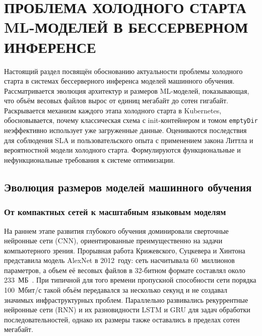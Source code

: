 \section{ПРОБЛЕМА ХОЛОДНОГО СТАРТА ML-МОДЕЛЕЙ В БЕССЕРВЕРНОМ ИНФЕРЕНСЕ}

Настоящий раздел посвящён обоснованию актуальности проблемы холодного старта в системах бессерверного инференса моделей машинного обучения. Рассматривается эволюция архитектур и размеров ML-моделей, показывающая, что объём весовых файлов вырос от единиц мегабайт до сотен гигабайт. Раскрывается механизм каждого этапа холодного старта в Kubernetes, обосновывается, почему классическая схема с init-контейнером и томом \texttt{emptyDir} неэффективно использует уже загруженные данные. Оцениваются последствия для соблюдения SLA и пользовательского опыта с применением закона Литтла и вероятностной модели холодного старта. Формулируются функциональные и нефункциональные требования к системе оптимизации.

\subsection{Эволюция размеров моделей машинного обучения}

\subsubsection{От компактных сетей к масштабным языковым моделям}

На раннем этапе развития глубокого обучения доминировали сверточные нейронные сети (CNN), ориентированные преимущественно на задачи компьютерного зрения. Прорывная работа Крижевского, Суцкевера и Хинтона представила модель AlexNet в 2012~году: сеть насчитывала 60~миллионов параметров, а объем её весовых файлов в 32-битном формате составлял около 233~МБ~\cite{alexnet2012}. При типичной для того времени пропускной способности сети порядка 100~Мбит/с такой объём передавался за несколько секунд и не создавал значимых инфраструктурных проблем. Параллельно развивались рекуррентные нейронные сети (RNN) и их разновидности LSTM и GRU для задач обработки последовательностей, однако их размеры также оставались в пределах сотен мегабайт.

